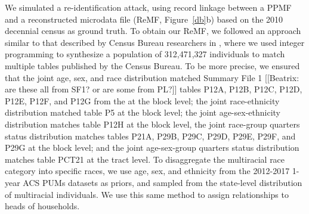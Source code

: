 \documentclass{article}
\begin{document}
We simulated a re-identification attack, using record linkage between a PPMF and a reconstructed microdata file (ReMF, Figure~\ref{db}b) based on the 2010 decennial census as ground truth. To obtain our ReMF, we followed an approach similar to that described by Census Bureau researchers in \cite{garfinkel2019understanding}, where we used integer programming to synthesize a population of 312,471,327 individuals to match multiple tables published by the Census Bureau. To be more precise, we ensured that the joint age, sex, and race distribution matched Summary File 1 [[Beatrix: are these all from SF1? or are some from PL?]] tables P12A, P12B, P12C, P12D, P12E, P12F, and P12G from the  at the block level; the joint race-ethnicity distribution matched table P5 at the block level; the joint age-sex-ethnicity distribution matches table P12H at the block level, the joint race-group quarters status distribution matches tables P21A, P29B, P29C, P29D, P29E, P29F, and P29G at the block level; and the joint age-sex-group quarters status distribution matches table PCT21 at the tract level. To disaggregate the multiracial race category into specific races, we use age, sex, and ethnicity from the 2012-2017 1-year ACS PUMs datasets as priors, and sampled from the state-level distribution of multiracial individuals. We use this same method to assign relationships to heads of households.
\end{document}
